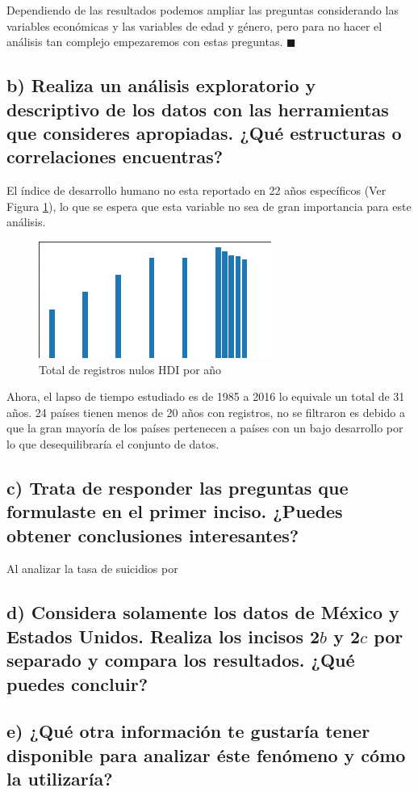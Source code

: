 \documentclass[paper=letter, fontsize=11pt]{scrartcl}
\numberwithin{equation}{section} %
\numberwithin{figure}{section} %
\numberwithin{table}{section} %
\begin{document}
Dependiendo de las resultados podemos ampliar las preguntas considerando las variables económicas y las variables de edad y género, pero para no hacer el análisis tan complejo empezaremos con estas preguntas. $\blacksquare$

\subsection{b) Realiza un análisis exploratorio y descriptivo de los datos con las herramientas que consideres apropiadas. ¿Qué estructuras o correlaciones encuentras?}

El índice de desarrollo humano no esta reportado en 22 años específicos (Ver Figura \ref{hdi_null}), lo que se espera que esta variable no sea de gran importancia para este análisis. 

\begin{figure}[h]
    \centering
    \includegraphics{../figs/dhi_null.png}
    \caption{Total de registros nulos HDI por año}
    \label{hdi_null}
\end{figure}

Ahora, el lapso de tiempo estudiado es de 1985 a 2016 lo equivale un total de 31 años. 24 países tienen menos de 20 años con registros, no se filtraron es debido a que la gran mayoría de los países pertenecen a países con un bajo desarrollo por lo que desequilibraría el conjunto de datos. 



\subsection{c) Trata de responder las preguntas que formulaste en el primer inciso. ¿Puedes obtener conclusiones interesantes?}

Al analizar la tasa de suicidios por 

\subsection{d) Considera solamente los datos de México y Estados Unidos. Realiza los incisos
2$b$ y 2$c$ por separado y compara los resultados. ¿Qué puedes concluir?}

\subsection{e) ¿Qué otra información te gustaría tener disponible para analizar éste fenómeno y cómo la utilizaría?}
\end{document}
